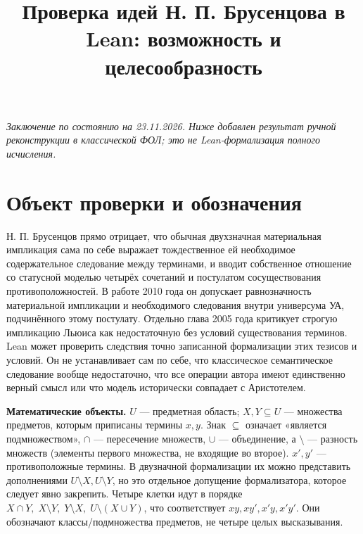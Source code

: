 \documentclass[12pt,a4paper]{article}
\title{Проверка идей Н. П. Брусенцова в Lean: возможность и целесообразность}
\author{}
\date{}
\begin{document}
\maketitle

\emph{Заключение по состоянию на 23.11.2026. Ниже добавлен результат ручной реконструкции в классической ФОЛ; это не Lean-формализация полного исчисления.}

\section*{Объект проверки и обозначения}

Н. П. Брусенцов прямо отрицает, что обычная двухзначная материальная импликация сама по себе выражает тождественное ей необходимое содержательное следование между терминами, и вводит собственное отношение со статусной моделью четырёх сочетаний и постулатом сосуществования противоположностей. В работе 2010 года он допускает равнозначность материальной импликации и необходимого следования внутри универсума \(\text{УА}\), подчинённого этому постулату. Отдельно глава 2005 года критикует строгую импликацию Льюиса как недостаточную без условий существования терминов. Lean может проверить следствия точно записанной формализации этих тезисов и условий. Он не устанавливает сам по себе, что классическое семантическое следование вообще недостаточно, что все операции автора имеют единственно верный смысл или что модель исторически совпадает с Аристотелем.

\textbf{Математические объекты.} \(U\) — предметная область; \(X,Y\subseteq U\) — множества предметов, которым приписаны термины \(x,y\). Знак \(\subseteq\) означает «является подмножеством», \(\cap\) — пересечение множеств, \(\cup\) — объединение, а \(\setminus\) — разность множеств (элементы первого множества, не входящие во второе). \(x',y'\) — противоположные термины. В двузначной формализации их можно представить дополнениями \(U\setminus X,U\setminus Y\), но это отдельное допущение формализатора, которое следует явно закрепить. Четыре клетки идут в порядке \(X\cap Y,\;X\setminus Y,\;Y\setminus X,\;U\setminus(X\cup Y)\), что соответствует \(xy,xy',x'y,x'y'\). Они обозначают классы/подмножества предметов, не четыре целых высказывания.
\end{document}
